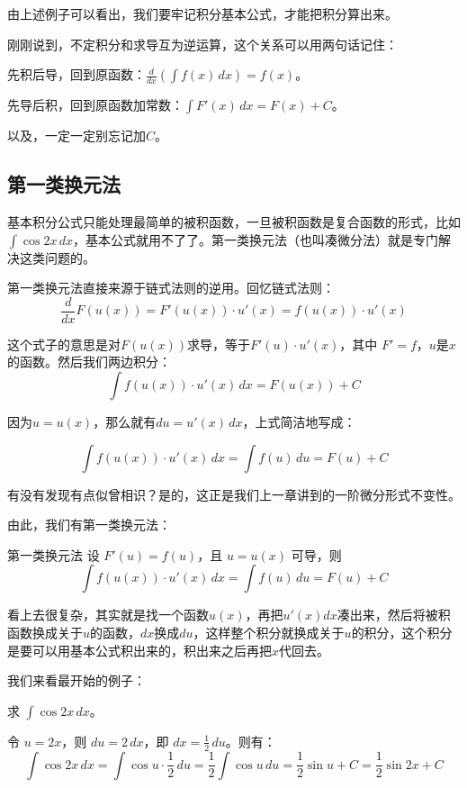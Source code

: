 由上述例子可以看出，我们要牢记积分基本公式，才能把积分算出来。

刚刚说到，不定积分和求导互为逆运算，这个关系可以用两句话记住：

先积后导，回到原函数：$ \frac{d}{dx}(\int f(x)\, dx) = f(x)$。

先导后积，回到原函数加常数：$\displaystyle \int F'(x)\, dx = F(x) + C$。

以及，一定一定别忘记加$C$。


\subsection{第一类换元法}

基本积分公式只能处理最简单的被积函数，一旦被积函数是复合函数的形式，比如 $\int \cos 2x \,dx$，基本公式就用不了了。第一类换元法（也叫凑微分法）就是专门解决这类问题的。

第一类换元法直接来源于链式法则的逆用。回忆链式法则：
\[
\frac{d}{dx} F(u(x)) = F'(u(x)) \cdot u'(x) = f(u(x)) \cdot u'(x)
\]

这个式子的意思是对$F(u(x))$求导，等于$F'(u) \cdot u'(x)$，其中 $ F' = f$，$u$是$x$的函数。然后我们两边积分：
\[
\int f(u(x)) \cdot u'(x)\, dx = F(u(x)) + C
\]

因为$u=u(x)$，那么就有$du = u'(x)\, dx$，上式简洁地写成：

\[
\int f(u(x)) \cdot u'(x)\, dx = \int f(u)\, du = F(u) + C
\]

有没有发现有点似曾相识？是的，这正是我们上一章讲到的一阶微分形式不变性。

由此，我们有第一类换元法：
\begin{theorem}{第一类换元法}{}
  设 $F'(u) = f(u)$，且 $u = u(x)$ 可导，则
\[
\int f(u(x)) \cdot u'(x)\, dx = \int f(u)\, du = F(u) + C
\]
\end{theorem}

看上去很复杂，其实就是找一个函数$u(x)$，再把$u'(x)dx$凑出来，然后将被积函数换成关于$u$的函数，$dx$换成$du$，这样整个积分就换成关于$u$的积分，这个积分是要可以用基本公式积出来的，积出来之后再把$x$代回去。

我们来看最开始的例子：

\begin{myexample}
  求 $\int \cos 2x\, dx$。

  令 $u = 2x$，则 $du = 2\, dx$，即 $dx = \frac{1}{2}\, du$。则有：
  \[
  \int \cos 2x\, dx = \int \cos u \cdot \frac{1}{2}\, du
  = \frac{1}{2} \int \cos u\, du
  = \frac{1}{2} \sin u + C
  = \frac{1}{2} \sin 2x + C
  \]
\end{myexample}

